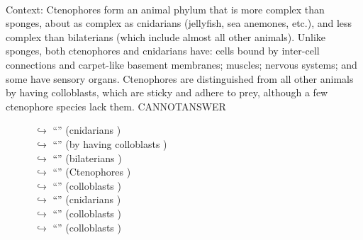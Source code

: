 \documentclass[11pt,a4paper, onecolumn]{article}
\begin{document}
\\ Context: Ctenophores form an animal phylum that is more complex than sponges, about as complex as cnidarians (jellyfish, sea anemones, etc.), and less complex than bilaterians (which include almost all other animals). Unlike sponges, both ctenophores and cnidarians have: cells bound by inter-cell connections and carpet-like basement membranes; muscles; nervous systems; and some have sensory organs. Ctenophores are distinguished from all other animals by having colloblasts, which are sticky and adhere to prey, although a few ctenophore species lack them. CANNOTANSWER

\begin{figure}[t] \small \begin{tcolorbox}[boxsep=0pt,left=5pt,right=0pt,top=2pt,colback = yellow!5] \begin{dialogue}
 \small 
\colorbox{pink!25}{$\hookrightarrow$}
{ ``'' (cnidarians ) }
\\
\colorbox{pink!25}{$\hookrightarrow$}
{ ``'' (by having colloblasts ) }
\\
\colorbox{pink!25}{$\hookrightarrow$}
{ ``'' (bilaterians ) }
\\
\colorbox{pink!25}{$\hookrightarrow$}
{ ``'' (Ctenophores ) }
\\
\colorbox{pink!25}{$\hookrightarrow$}
{ ``'' (colloblasts ) }
\\
\colorbox{pink!25}{$\hookrightarrow$}
{ ``'' (cnidarians ) }
\\
\colorbox{pink!25}{$\hookrightarrow$}
{ ``'' (colloblasts ) }
\\
\colorbox{pink!25}{$\hookrightarrow$}
{ ``'' (colloblasts ) }
\\

\end{dialogue}
\end{tcolorbox}
\end{figure}
\end{document}
